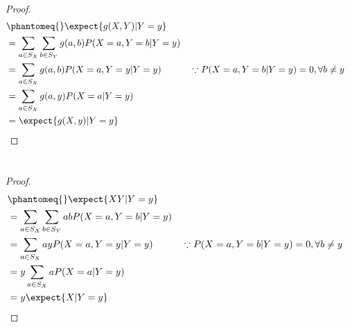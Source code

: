 \documentclass[
  coursecode={MTHE 455},
  assignmentname={Assignment \assignmentnumber},
  studentnumber=20053722,
  name={Bryan Hoang}
]{
  ltxanswer%
}
\begin{document}
  \begin{questions}
    \setcounter{question}{\questionnumber}
    \addtocounter{question}{-1}
    \question\
    \begin{parts}
      \part{}
      \begin{solution}
        \begin{proof}
          \begin{align*}
             &\phantomeq{} \expect{g(X,Y)|Y=y}                                                                             \\
             &= \sum_{a \in S_{X}} \sum_{b \in S_{Y}} g(a,b) P(X=a,Y=b|Y=y)                                                \\
             &= \sum_{a \in S_{X}} g(a,b) P(X=a,Y=y|Y=y)                    & &\because P(X=a,Y=b|Y=y)=0, \forall b \neq y \\
             &= \sum_{a \in S_{X}} g(a,y) P(X=a|Y=y)                                                                       \\
             &= \expect{g(X,y)|Y=y}
          \end{align*}
        \end{proof}
      \end{solution}

      \part{}
      \begin{solution}
        \begin{proof}
          \begin{align*}
             &\phantomeq{} \expect{XY|Y=y}                                                                            \\
             &= \sum_{a \in S_{X}} \sum_{b \in S_{Y}} abP(X=a,Y=b|Y=y)                                                \\
             &= \sum_{a \in S_{X}} ayP(X=a,Y=y|Y=y)                    & &\because P(X=a,Y=b|Y=y)=0, \forall b \neq y \\
             &= y\sum_{a \in S_{X}} aP(X=a|Y=y)                                                                       \\
             &= y\expect{X|Y=y}
          \end{align*}
        \end{proof}
      \end{solution}


\end{parts}
\end{questions}
\end{document}
